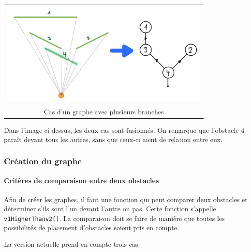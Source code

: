 \documentclass[11pt,french,a4paper,]{article}
\let\oldparagraph\paragraph
\renewcommand{\paragraph}[1]{\oldparagraph{#1}\mbox{}}
\begin{document}
\begin{longtable}[]{@{}c@{}}
\toprule
\endhead
\includegraphics[width=\textwidth,height=2.08333in]{../img/Graphs/graph_overlap3.png}\tabularnewline
Cas d'un graphe avec plusieurs branches\tabularnewline
\bottomrule
\end{longtable}

Dans l'image ci-dessus, les deux cas sont fusionnés. On remarque que
l'obstacle 4 paraît devant tous les autres, sans que ceux-ci aient de
relation entre eux.

\hypertarget{cruxe9ation-du-graphe}{%
\subsubsection{Création du graphe}\label{cruxe9ation-du-graphe}}

\hypertarget{crituxe8res-de-comparaison-entre-deux-obstacles}{%
\paragraph{Critères de comparaison entre deux
obstacles}\label{crituxe8res-de-comparaison-entre-deux-obstacles}}

Afin de créer les graphes, il faut une fonction qui peut comparer deux
obstacles et déterminer s'ils sont l'un devant l'autre ou pas. Cette
fonction s'appelle \texttt{v1HigherThanv2()}. La comparaison doit se
faire de manière que toutes les possibilités de placement d'obstacles
soient pris en compte.

La version actuelle prend en compte trois cas.
\end{document}
